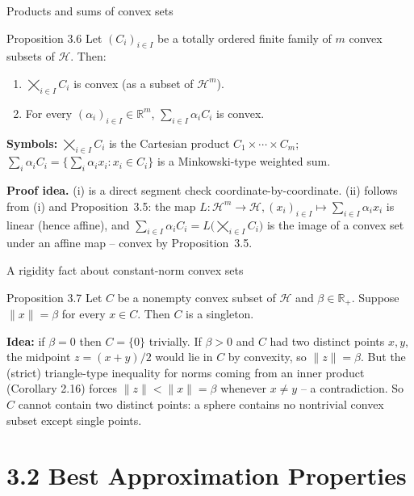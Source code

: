 \documentclass[aspectratio=169,10pt]{beamer}
\newcommand{\Hil}{\mathcal{H}}
\newcommand{\R}{\mathbb{R}}
\newcommand{\Rp}{\mathbb{R}_{+}}
\newcommand{\norm}[1]{\lVert #1 \rVert}
\begin{document}
\begin{frame}{Products and sums of convex sets}
  \begin{block}{Proposition 3.6}
    Let $(C_i)_{i\in I}$ be a totally ordered finite family of $m$ convex
    subsets of $\Hil$. Then:
    \begin{enumerate}
      \item[(i)] $\bigtimes_{i\in I} C_i$ is convex (as a subset of
        $\Hil^m$).
      \item[(ii)] For every $(\alpha_i)_{i\in I}\in\R^m$,
        $\sum_{i\in I}\alpha_i C_i$ is convex.
    \end{enumerate}
  \end{block}
  \textbf{Symbols:} $\bigtimes_{i\in I}C_i$ is the Cartesian product
  $C_1\times\cdots\times C_m$; $\sum_i \alpha_i C_i = \{\sum_i \alpha_i x_i :
  x_i \in C_i\}$ is a Minkowski-type weighted sum.

  \textbf{Proof idea.} (i) is a direct segment check coordinate-by-coordinate.
  (ii) follows from (i) and Proposition~3.5: the map
  $L\colon\Hil^m\to\Hil, (x_i)_{i\in I}\mapsto \sum_{i\in I}\alpha_i x_i$ is
  linear (hence affine), and $\sum_{i\in I}\alpha_i C_i = L\big(\bigtimes_{i\in
  I} C_i\big)$ is the image of a convex set under an affine map -- convex by
  Proposition~3.5.
\end{frame}

\begin{frame}{A rigidity fact about constant-norm convex sets}
  \begin{block}{Proposition 3.7}
    Let $C$ be a nonempty convex subset of $\Hil$ and $\beta\in\Rp$. Suppose
    $\norm{x}=\beta$ for every $x\in C$. Then $C$ is a singleton.
  \end{block}
  \textbf{Idea:} if $\beta=0$ then $C=\{0\}$ trivially. If $\beta>0$ and $C$
  had two distinct points $x,y$, the midpoint $z=(x+y)/2$ would lie in $C$
  by convexity, so $\norm z=\beta$. But the (strict) triangle-type inequality
  for norms coming from an inner product (Corollary 2.16) forces
  $\norm z < \norm x = \beta$ whenever $x\ne y$ -- a contradiction. So $C$
  cannot contain two distinct points: a sphere contains no nontrivial convex
  subset except single points.
\end{frame}

\section{3.2 Best Approximation Properties}
\end{document}
